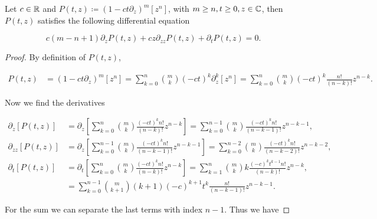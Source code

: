 \begin{theorem}
    Let $c\in \mathbb R$ and $P(t,z) \coloneqq \left( 1 - ct\partial_z \right)^m [z^n]$, with $m \ge n, t\ge 0, z \in \mathbb C$, then $P(t,z)$ satisfies the following differential equation

    \begin{equation*} 
        c(m-n+1)\partial_z P(t,z) + cz  \partial_{zz}P(t,z) + \partial_t P(t,z) = 0.
     \end{equation*}

\end{theorem}

 \begin{proof}
    By definition of $P(t,z)$,

    \begin{align*}
        P(t,z) &= \left( 1 - ct\partial_z \right)^m [z^n] = \sum_{k=0}^n \binom{m}{k}\left( -ct \right)^k \partial_z^k [z^n ] = \sum_{k=0}^n \binom{m}{k}\left( -ct \right)^k \frac{n!}{(n-k)!}z^{n-k}.
    \end{align*}

    Now we find the derivatives

    \begin{align*}
        \partial_z [P(t,z)] &= \partial_z\left[ \sum_{k=0}^n \binom{m}{k} \frac{\left( -ct \right)^k n!}{(n-k)!}z^{n-k} \right] = \sum_{k=0}^{n-1} \binom{m}{k} \frac{\left( -ct \right)^k n!}{(n-k-1)!}z^{n-k-1},\\ 
        \partial_{zz} [P(t,z)] &= \partial_z\left[\sum_{k=0}^{n-1} \binom{m}{k} \frac{\left(-ct\right)^k n!}{(n-k-1)!}z^{n-k-1}\right] = \sum_{k=0}^{n-2} \binom{m}{k} \frac{\left(-ct\right)^k n!}{(n-k-2)!}z^{n-k-2},\\ 
        \partial_t [P(t,z)] &= \partial_t \left[ \sum_{k=0}^n \binom{m}{k} \frac{\left( -ct \right)^k n!}{(n-k)!}z^{n-k} \right] = \sum_{k=1}^n \binom{m}{k}k \frac{(-c)^kt^{k-1} n!}{(n-k)!}z^{n-k},\\ 
        &= \sum_{k=0}^{n-1} \binom{m}{k+1}(k+1)(-c)^{k+1}t^{k} \frac{n!}{(n-k-1)!}z^{n-k-1}.
    \end{align*}

    For the sum we can separate the last terms with index $n-1$. Thus we have


\end{proof}

